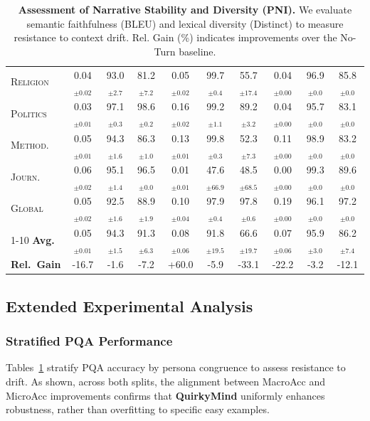 \begin{table}[!t]
\begin{tabular}{l ccc ccc ccc}
\textsc{Religion} & 0.04$_{\pm 0.02}$ & 93.0$_{\pm 2.7}$ & 81.2$_{\pm 7.2}$ & 0.05$_{\pm 0.02}$ & 99.7$_{\pm 0.4}$ & 55.7$_{\pm 17.4}$ & 0.04$_{\pm 0.00}$ & 96.9$_{\pm 0.0}$ & 85.8$_{\pm 0.0}$ \\
\textsc{Politics} & 0.03$_{\pm 0.01}$ & 97.1$_{\pm 0.3}$ & 98.6$_{\pm 0.2}$ & 0.16$_{\pm 0.02}$ & 99.2$_{\pm 1.1}$ & 89.2$_{\pm 3.2}$ & 0.04$_{\pm 0.00}$ & 95.7$_{\pm 0.0}$ & 83.1$_{\pm 0.0}$ \\
\textsc{Method.} & 0.05$_{\pm 0.01}$ & 94.3$_{\pm 1.6}$ & 86.3$_{\pm 1.0}$ & 0.13$_{\pm 0.01}$ & 99.8$_{\pm 0.3}$ & 52.3$_{\pm 7.3}$ & 0.11$_{\pm 0.00}$ & 98.9$_{\pm 0.0}$ & 83.2$_{\pm 0.0}$ \\
\textsc{Journ.} & 0.06$_{\pm 0.02}$ & 95.1$_{\pm 1.4}$ & 96.5$_{\pm 0.0}$ & 0.01$_{\pm 0.01}$ & 47.6$_{\pm 66.9}$ & 48.5$_{\pm 68.5}$ & 0.00$_{\pm 0.00}$ & 99.3$_{\pm 0.0}$ & 89.6$_{\pm 0.0}$ \\
\textsc{Global} & 0.05$_{\pm 0.02}$ & 92.5$_{\pm 1.6}$ & 88.9$_{\pm 1.9}$ & 0.10$_{\pm 0.04}$ & 97.9$_{\pm 0.4}$ & 97.8$_{\pm 0.6}$ & 0.19$_{\pm 0.00}$ & 96.1$_{\pm 0.0}$ & 97.2$_{\pm 0.0}$ \\
\cmidrule{1-10}
\textbf{Avg.} & 0.05$_{\pm 0.01}$ & 94.3$_{\pm 1.5}$ & 91.3$_{\pm 6.3}$ & 0.08$_{\pm 0.06}$ & 91.8$_{\pm 19.5}$ & 66.6$_{\pm 19.7}$ & 0.07$_{\pm 0.06}$ & 95.9$_{\pm 3.0}$ & 86.2$_{\pm 7.4}$ \\
\rowcolor{gray!10} \textbf{Rel.\ Gain} 
& -16.7 & -1.6 & -7.2
& +60.0 & -5.9 & -33.1
& -22.2 & -3.2 & -12.1\\

\bottomrule
\end{tabular}
\caption{\textbf{Assessment of Narrative Stability and Diversity (PNI).} We evaluate semantic faithfulness (BLEU) and lexical diversity (Distinct) to measure resistance to context drift. Rel. Gain (\%) indicates improvements over the No-Turn baseline.}
\label{tab:pni_overall}
\end{table}











\subsection{Extended Experimental Analysis}\label{sec:eexp}

\subsubsection{Stratified PQA Performance}
Tables~\ref{tab:pni_overall} stratify PQA accuracy by persona congruence to assess resistance to drift.
As shown, across both splits, the alignment between MacroAcc and MicroAcc improvements confirms that \textbf{QuirkyMind} uniformly enhances robustness, rather than overfitting to specific easy examples.


